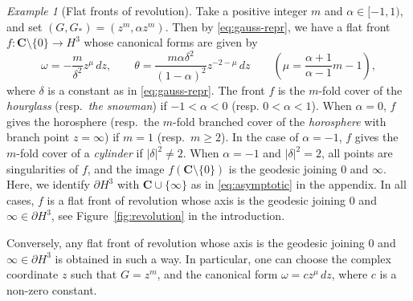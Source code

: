 \documentclass[a4paper]{amsart}
\theoremstyle{plain}
\theoremstyle{remark}
\newtheorem{example}[theorem]{Example}
\numberwithin{equation}{section}
\begin{document}
\begin{example}[Flat fronts of revolution]
 \label{ex:revolution}
 Take a positive integer $m$ and $\alpha\in [-1,1)$,
 and set $(G,G_*)=(z^m,\alpha z^m)$.
 Then by \eqref{eq:gauss-repr}, we have a flat front
 $f\colon{}{\boldsymbol{C}}\setminus\{0\}\to H^3$ whose canonical forms 
 are given by
 \[
     \omega = -\frac{m}{\delta^2} z^\mu\,dz,\qquad
     \theta = \frac{m\alpha\delta^2}{(1-\alpha)^2} z^{-2-\mu}\,dz
     \qquad
     \left(
          \mu=\frac{\alpha+1}{\alpha-1}m-1
     \right),
 \]
 where $\delta$ is a constant as in \eqref{eq:gauss-repr}.
 The front $f$ is 
 the $m$-fold cover of the {\em hourglass\/} 
 (resp.\ {\em the snowman}\/)
 if $-1<\alpha<0$ (resp. $0<\alpha<1$).
 When $\alpha=0$, $f$ gives the horosphere
 (resp.\ the $m$-fold branched cover of the {\em horosphere\/}
 with branch point $z=\infty$)
 if $m=1$ (resp.\ $m\geq 2$).
 In the case of $\alpha=-1$, 
 $f$ gives the $m$-fold cover of a {\em cylinder\/} if $|\delta|^2\neq 2$.
 When $\alpha=-1$ and $|\delta|^2=2$, all points are singularities
 of $f$, and the image $f({\boldsymbol{C}}\setminus\{0\})$ is the geodesic
 joining $0$ and $\infty$.
 Here, we identify $\partial H^3$ with  ${\boldsymbol{C}}\cup\{\infty\}$
 as in \eqref{eq:asymptotic} in the appendix.
 In all cases, 
 $f$ is a flat front of revolution 
 whose axis is the geodesic joining $0$ and $\infty\in\partial H^3$,
 see Figure~\ref{fig:revolution} in the introduction.

 Conversely, any flat front of revolution whose axis 
 is the geodesic joining $0$ and $\infty\in\partial H^3$ is 
 obtained in such a way.
 In particular, one can choose the complex coordinate $z$ such that
 $G=z^m$, and the canonical form 
 $\omega=cz^{\mu}\,dz$, where $c$ is a non-zero constant.
\end{example}
\end{document}
